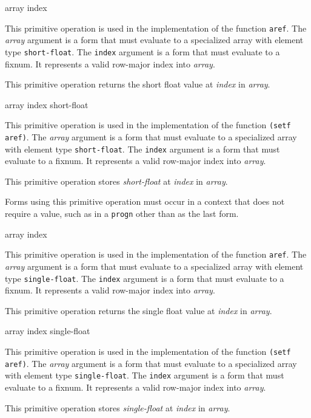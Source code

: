  {array index}

This primitive operation is used in the implementation of the
\commonlisp{} function \texttt{aref}.  The \textit{array} argument is
a form that must evaluate to a specialized array with element type
\texttt{short-float}.  The \texttt{index} argument is a form that must
evaluate to a fixnum.  It represents a valid row-major index into
\textit{array}.

This primitive operation returns the short float value at
\textit{index} in \textit{array}.

 {array index short-float}

This primitive operation is used in the implementation of the
\commonlisp{} function \texttt{(setf aref)}.  The \textit{array}
argument is a form that must evaluate to a specialized array with
element type \texttt{short-float}.  The \texttt{index} argument is a
form that must evaluate to a fixnum.  It represents a valid row-major
index into \textit{array}.

This primitive operation stores \textit{short-float} at \textit{index}
in \textit{array}.

Forms using this primitive operation must occur in a context that does
not require a value, such as in a \texttt{progn} other than as the
last form.

 {array index}

This primitive operation is used in the implementation of the
\commonlisp{} function \texttt{aref}.  The \textit{array} argument is
a form that must evaluate to a specialized array with element type
\texttt{single-float}.  The \texttt{index} argument is a form that
must evaluate to a fixnum.  It represents a valid row-major index into
\textit{array}.

This primitive operation returns the single float value at
\textit{index} in \textit{array}.

 {array index single-float}

This primitive operation is used in the implementation of the
\commonlisp{} function \texttt{(setf aref)}.  The \textit{array}
argument is a form that must evaluate to a specialized array with
element type \texttt{single-float}.  The \texttt{index} argument is a
form that must evaluate to a fixnum.  It represents a valid row-major
index into \textit{array}.

This primitive operation stores \textit{single-float} at
\textit{index} in \textit{array}.

